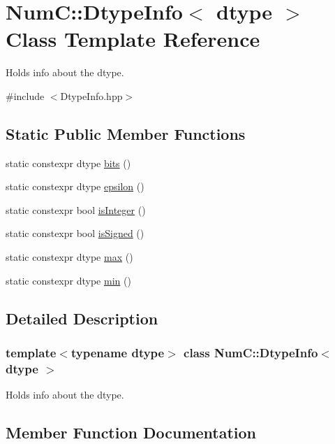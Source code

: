 \hypertarget{class_num_c_1_1_dtype_info}{}\section{NumC\+:\+:Dtype\+Info$<$ dtype $>$ Class Template Reference}
\label{class_num_c_1_1_dtype_info}


Holds info about the dtype.  




{\ttfamily \#include $<$Dtype\+Info.\+hpp$>$}

\subsection*{Static Public Member Functions}
\begin{DoxyCompactItemize}
\item 
static constexpr dtype \mbox{\hyperlink{class_num_c_1_1_dtype_info_a7e3340a565e65c5b11bed3600ccbad93}{bits}} ()
\item 
static constexpr dtype \mbox{\hyperlink{class_num_c_1_1_dtype_info_a2f1d9e60fc1d2d64a69d4012ec72c43b}{epsilon}} ()
\item 
static constexpr bool \mbox{\hyperlink{class_num_c_1_1_dtype_info_a6409e79e849007fae15f9042ccc5ac6c}{is\+Integer}} ()
\item 
static constexpr bool \mbox{\hyperlink{class_num_c_1_1_dtype_info_ab9b12306c685ba2c50c896ed340668e2}{is\+Signed}} ()
\item 
static constexpr dtype \mbox{\hyperlink{class_num_c_1_1_dtype_info_ac19287412d0d71988d09bba9a4e3a01c}{max}} ()
\item 
static constexpr dtype \mbox{\hyperlink{class_num_c_1_1_dtype_info_a0203027ae62ac389c1794cfe22e990a1}{min}} ()
\end{DoxyCompactItemize}


\subsection{Detailed Description}
\subsubsection*{template$<$typename dtype$>$\newline
class Num\+C\+::\+Dtype\+Info$<$ dtype $>$}

Holds info about the dtype. 

\subsection{Member Function Documentation}
\mbox{\label{class_num_c_1_1_dtype_info_a7e3340a565e65c5b11bed3600ccbad93}} 
